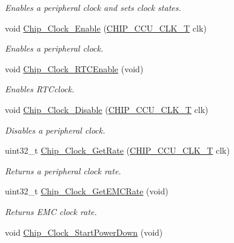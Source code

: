 \begin{DoxyCompactItemize}
\begin{DoxyCompactList}\small\item\em Enables a peripheral clock and sets clock states. \end{DoxyCompactList}\item 
void \hyperlink{group___c_l_o_c_k__18_x_x__43_x_x_ga002dee3b9dfa6bde2445e6fff165f0f1}{Chip\+\_\+\+Clock\+\_\+\+Enable} (\hyperlink{chip__clocks_8h_a45bb23228b9831321626c103ada7c60b}{C\+H\+I\+P\+\_\+\+C\+C\+U\+\_\+\+C\+L\+K\+\_\+T} clk)
\begin{DoxyCompactList}\small\item\em Enables a peripheral clock. \end{DoxyCompactList}\item 
void \hyperlink{group___c_l_o_c_k__18_x_x__43_x_x_gad43f808e0218e20dfc000fc0248da1a4}{Chip\+\_\+\+Clock\+\_\+\+R\+T\+C\+Enable} (void)
\begin{DoxyCompactList}\small\item\em Enables R\+T\+Cclock. \end{DoxyCompactList}\item 
void \hyperlink{group___c_l_o_c_k__18_x_x__43_x_x_ga847e7bcd709e030752213380e78039ec}{Chip\+\_\+\+Clock\+\_\+\+Disable} (\hyperlink{chip__clocks_8h_a45bb23228b9831321626c103ada7c60b}{C\+H\+I\+P\+\_\+\+C\+C\+U\+\_\+\+C\+L\+K\+\_\+T} clk)
\begin{DoxyCompactList}\small\item\em Disables a peripheral clock. \end{DoxyCompactList}\item 
uint32\+\_\+t \hyperlink{group___c_l_o_c_k__18_x_x__43_x_x_gafb964074c3fa133e29c51bd31e4590ae}{Chip\+\_\+\+Clock\+\_\+\+Get\+Rate} (\hyperlink{chip__clocks_8h_a45bb23228b9831321626c103ada7c60b}{C\+H\+I\+P\+\_\+\+C\+C\+U\+\_\+\+C\+L\+K\+\_\+T} clk)
\begin{DoxyCompactList}\small\item\em Returns a peripheral clock rate. \end{DoxyCompactList}\item 
uint32\+\_\+t \hyperlink{group___c_l_o_c_k__18_x_x__43_x_x_gaf8fefd2c98eee4d7954719d828a1cad8}{Chip\+\_\+\+Clock\+\_\+\+Get\+E\+M\+C\+Rate} (void)
\begin{DoxyCompactList}\small\item\em Returns E\+MC clock rate. \end{DoxyCompactList}\item 
void \hyperlink{group___c_l_o_c_k__18_x_x__43_x_x_ga4211f2f6083501edf23d418eb267b5aa}{Chip\+\_\+\+Clock\+\_\+\+Start\+Power\+Down} (void)

\end{DoxyCompactItemize}
